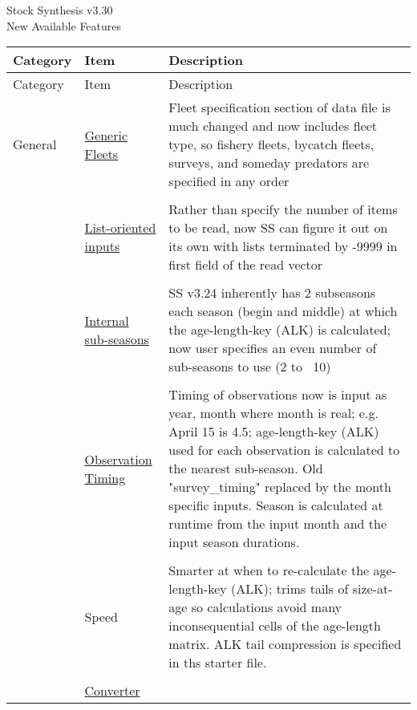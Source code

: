 \documentclass[12pt]{article}
\begin{document}
\begin{center}
	\Large{Stock Synthesis v3.30\\
	New Available Features\\}
\end{center}

\begin{center}
	\begin{longtable}{p{2cm} p{3cm} p{10cm}}
		Category & Item & Description\\
		\hline
		\endfirsthead
		
		Category & Item & Description\\
		\hline
		\endhead
		
		\hline
		\endfoot
		
		\endlastfoot
		
		General & 
		\hyperlink{GenericFleets}{Generic Fleets} & 
		Fleet specification section of data file is much changed and now includes fleet type, so fishery fleets, bycatch fleets, surveys, and someday predators are specified in any order\\
		\\
		& \hyperlink{ListBased}{List-oriented inputs} & 
		Rather than specify the number of items to be read, now SS can figure it out on its own with lists terminated by -9999 in first field of the read vector \\
		\\					  
		& \hyperlink{SubSeas}{Internal sub-seasons} & 
		SS v3.24 inherently has 2 subseasons each season (begin and middle) at which the age-length-key (ALK) is calculated; now user specifies an even number of sub-seasons to use (2 to ~10) \\
		\\
		& \hyperlink{ObsTiming}{Observation Timing} & 
		Timing of observations now is input as year, month where month is real; e.g. April 15 is 4.5; age-length-key (ALK) used for each observation is calculated to the nearest sub-season.  Old "survey\_timing" replaced by the month specific inputs.  Season is calculated at runtime from the input month and the input season durations. \\
		\\
		& Speed & 
		Smarter at when to re-calculate the age-length-key (ALK); trims tails of size-at-age so calculations avoid many inconsequential cells of the age-length matrix. ALK tail compression is specified in ths starter file.\\
		\\				
		& \hyperlink{Convert} {Converter} & 

\end{longtable}
\end{center}
\end{document}
